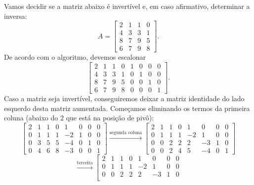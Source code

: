 \documentclass[../livro.tex]{subfiles}  %
\begin{document}
\begin{example}
	Vamos decidir se a matriz abaixo é invertível e, em caso afirmativo, determinar a inversa:
	\begin{equation}
	A =
	\left[
	\begin{array}{cccc}
	2 & 1 & 1 & 0 \\
	4 & 3 & 3 & 1 \\
	8 & 7 & 9 & 5 \\
	6 & 7 & 9 & 8 
	\end{array}
	\right].
	\end{equation} De acordo com o algoritmo, devemos escalonar
	\begin{equation}
	\left[
	\begin{array}{cccc|cccc}
	2 & 1 & 1 & 0 & 1 & 0 & 0 & 0 \\
	4 & 3 & 3 & 1 & 0 & 1 & 0 & 0 \\
	8 & 7 & 9 & 5 & 0 & 0 & 1 & 0 \\
	6 & 7 & 9 & 8 & 0 & 0 & 0 & 1 
	\end{array}
	\right].
	\end{equation} Caso a matriz seja invertível, conseguiremos deixar a matriz identidade do lado esquerdo desta matriz aumentada. Começamos eliminando os termos da primeira coluna (abaixo do $2$ que está na posição de pivô):
	\begin{equation}
	\left[
	\begin{array}{cccc|cccc}
	2 & 1 & 1 & 0 & 1 & 0 & 0 & 0 \\
	0 & 1 & 1 & 1 & -2 & 1 & 0 & 0 \\
	0 & 3 & 5 & 5 & -4 & 0 & 1 & 0 \\
	0 & 4 & 6 & 8 & -3 & 0 & 0 & 1 
	\end{array}
	\right] \xrightarrow{\text{segunda coluna}}
	\left[
	\begin{array}{cccc|cccc}
	2 & 1 & 1 & 0 & 1 & 0 & 0 & 0 \\
	0 & 1 & 1 & 1 & -2 & 1 & 0 & 0 \\
	0 & 0 & 2 & 2 & 2 & -3 & 1 & 0 \\
	0 & 0 & 2 & 4 & 5 & -4 & 0 & 1 
	\end{array}
	\right]
	\end{equation}
	\begin{equation}
	\xrightarrow{\text{terceira}}
	\left[
	\begin{array}{cccc|cccc}
	2 & 1 & 1 & 0 & 1 & 0 & 0 & 0 \\
	0 & 1 & 1 & 1 & -2 & 1 & 0 & 0 \\
	0 & 0 & 2 & 2 & 2 & -3 & 1 & 0 \\

\end{array}
\end{equation}
\end{example}
\end{document}
